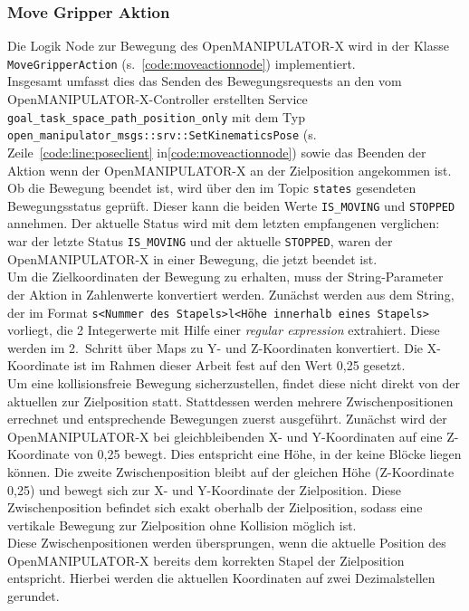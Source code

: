 \subsubsection{Move Gripper Aktion}
Die Logik Node zur Bewegung des OpenMANIPULATOR-X wird in der Klasse \verb|MoveGripperAction| (s.~\ref{code:moveactionnode}) implementiert.\\
Insgesamt umfasst dies das Senden des Bewegungsrequests an den vom OpenMANIPULATOR-X-Controller erstellten Service \verb|goal_task_space_path_position_only| mit dem Typ \verb|open_manipulator_msgs::srv::SetKinematicsPose| (s. Zeile~\ref{code:line:poseclient} in\ref{code:moveactionnode}) sowie das Beenden der Aktion wenn der OpenMANIPULATOR-X an der Zielposition angekommen ist.
Ob die Bewegung beendet ist, wird über den im Topic \verb|states| gesendeten Bewegungsstatus geprüft.
Dieser kann die beiden Werte \verb|IS_MOVING| und \verb|STOPPED| annehmen.
Der aktuelle Status wird mit dem letzten empfangenen verglichen: war der letzte Status \verb|IS_MOVING| und der aktuelle \verb|STOPPED|, waren der OpenMANIPULATOR-X in einer Bewegung, die jetzt beendet ist.\\
Um die Zielkoordinaten der Bewegung zu erhalten, muss der String-Parameter der Aktion in Zahlenwerte konvertiert werden.
Zunächst werden aus dem String, der im Format \verb|s<Nummer des Stapels>l<Höhe innerhalb eines Stapels>| vorliegt, die 2 Integerwerte mit Hilfe einer \emph{regular expression} extrahiert.
Diese werden im 2.\ Schritt über Maps zu Y- und Z-Koordinaten konvertiert.
Die X-Koordinate ist im Rahmen dieser Arbeit fest auf den Wert 0,25 gesetzt.\\
Um eine kollisionsfreie Bewegung sicherzustellen, findet diese nicht direkt von der aktuellen zur Zielposition statt.
Stattdessen werden mehrere Zwischenpositionen errechnet und entsprechende Bewegungen zuerst ausgeführt.
Zunächst wird der OpenMANIPULATOR-X bei gleichbleibenden X- und Y-Koordinaten auf eine Z-Koordinate von 0,25 bewegt.
Dies entspricht eine Höhe, in der keine Blöcke liegen können.
Die zweite Zwischenposition bleibt auf der gleichen Höhe (Z-Koordinate 0,25) und bewegt sich zur X- und Y-Koordinate der Zielposition.
Diese Zwischenposition befindet sich exakt oberhalb der Zielposition, sodass eine vertikale Bewegung zur Zielposition ohne Kollision möglich ist.\\
Diese Zwischenpositionen werden übersprungen, wenn die aktuelle Position des OpenMANIPULATOR-X bereits dem korrekten Stapel der Zielposition entspricht.
Hierbei werden die aktuellen Koordinaten auf zwei Dezimalstellen gerundet.\\
